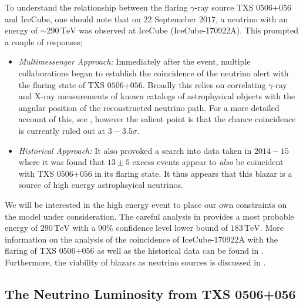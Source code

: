 To understand the relationship between the flaring $\gamma$-ray source TXS $0506$+$056$ and IceCube, one should note that on $22$ Septemeber $2017$, a neutrino with an energy of $\sim 290\,\textrm{TeV}$ was observed at IceCube (IceCube-170922A). This prompted a couple of responses;
\begin{itemize}
  \item \textit{Multimessenger Approach:} Immediately after the event, multiple collaborations began to establish the coincidence of the neutrino alert with the flaring state of TXS $0506$+$056$. Broadly this relies on correlating $\gamma$-ray and X-ray measurements of known catalogs of astrophysical objects with the angular position of the reconstructed neutrino path. For a more detailed account of this, see \cite{Ackermann2018}, however the salient point is that the chance coincidence is currently ruled out at $3-3.5\sigma$.
  \item \textit{Historical Approach:} It also provoked a search into data taken in $2014-15$ where it was found that $13 \pm 5$ excess events \cite{Kelly} appear to \textit{also} be coincident with TXS $0506$+$056$ in its flaring state. It thus appears that this blazar is a source of high energy astrophsyical neutrinos.
\end{itemize}
We will be interested in the high energy event to place our own constraints on the model under consideration. The careful analysis in \cite{Ackermann2018} provides a most probable energy of $290 \, \textrm{TeV}$ with a $90\%$ confidence level lower bound of $183 \, \textrm{TeV}$. More information on the analysis of the coincidence of IceCube-170922A with the flaring of TXS $0506$+$056$ as well as the historical data can be found in \cite{Ackermann2018, IceCube2018, Kelly, Padovani2018}. Furthermore, the viability of blazars as neutrino sources is discussed in \cite{Hooper2018, IceCube2018}.


\subsection{The Neutrino Luminosity from TXS 0506+056}\label{sec:nuluminosity}



